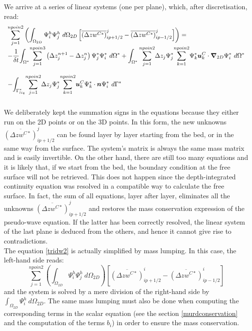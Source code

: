 We arrive at a series of linear systems (one per plane),
which, after discretisation, read:%
\begin{equation}
\begin{array}{l}
\displaystyle{\sum_{j=1}^{npoin2}}\left(
\int_{\Omega_{2D}}\Psi_{i}^{h}\Psi_{j}^{h}~d\Omega_{2D}\left[
\overline{\left(\Delta zw^{C\ast}\right)}_{ip+1/2}^{j}
-\overline{\left(\Delta zw^{C\ast}\right)}_{ip-1/2}^{j}
\right]\right) = \\\bigskip
-\dfrac{1}{\delta t}\displaystyle{\int_{\Omega^{\ast}}}
\displaystyle{\sum_{j=1}^{npoin3}}
\left(\Delta z_j^{n+1}-\Delta z_j^{n}\right)
\Psi_{j}^{\ast}\Psi_{i}^{\ast}~d\Omega^{\ast}
+\int_{\Omega^{\ast}}\displaystyle{\sum_{j=1}^{npoin2}}\Delta z_j\Psi_{j}^{\ast}\displaystyle{\sum_{k=1}^{npoin2}}\Psi_{k}^{\ast}\vec{u}_k^C\cdot\Grad_{2D}\Psi_{i}^{\ast}~d\Omega^{\ast}\\\bigskip
-\displaystyle{\int_{\Gamma_{liq}^{\ast}}}\displaystyle{\sum_{j=1}^{npoin2}}\Delta z_j\Psi_{j}^{\ast}\displaystyle{\sum_{k=1}^{npoin2}}\vec{u}_k^C\Psi_{k}^{\ast}\cdot\vec{n}\Psi_{i}^{\ast}~d\Gamma^{\ast}
\end{array}\label{tridw2}
\end{equation}
We deliberately kept the summation signs in the equations because they
either run on the 2D points or on the 3D points.
%
%
In this form, the
new unknowns $\overline{\left(\Delta zw^{C\ast}\right)  }_{ip+1/2}^{j}$
can be found layer by layer starting from the bed, or in the same
way from the surface.
The system's matrix is always the same mass matrix and is easily invertible.
On the other hand, there are still too many equations and it is likely that, if
we start from the bed, the boundary condition at the free surface will not
be retrieved. This does not happen since the depth-integrated
continuity equation was resolved in a compatible way to calculate the
free surface. In fact, the sum of all
equations, layer after layer, eliminates all the unknowns $\overline{\left(
\Delta zw^{C\ast}\right)  }_{ip+1/2}^{j}$ and restores the mass
conservation expression of the pseudo-wave equation.
If the latter has been correctly resolved, the linear system
of the last plane is deduced from the others,
and hence it cannot give rise to contradictions.\\

The equation \ref{tridw2}
is actually simplified by mass lumping.
In this case, the left-hand side reads:
\begin{equation}
\displaystyle{\sum_{j=1}^{npoin2}}\left(\int_{\Omega_{2D}}\Psi_{i}^{h}\Psi_{j}^{h}~d\Omega_{2D}\right)
\left[  \overline{\left(\Delta zw^{C\ast}\right)  }_{ip+1/2}^{i}-\overline{\left(  \Delta
zw^{C\ast}\right)  }_{ip-1/2}^{i}\right]
\end{equation}
and the system is solved by a mere division of the right-hand side by
$\int\nolimits_{\Omega_{2D}}\Psi_{i}^{h}~d\Omega_{2D}$. The same mass lumping
must also be done when computing the corresponding terms in the scalar
equation (see the section \ref{murdconservation} and the computation of the terms $b_{i}$) in order to ensure the mass conservation.


